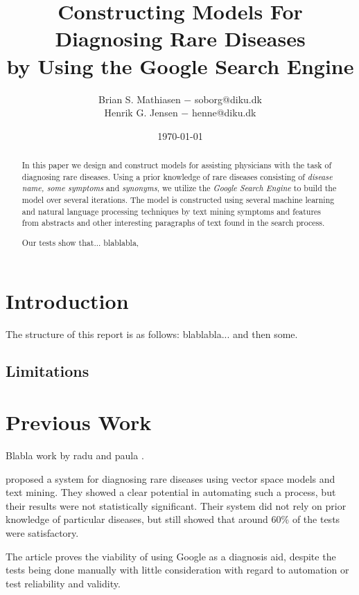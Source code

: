 \documentclass[10pt,letterpaper,final]{article}
\title{Constructing Models For Diagnosing Rare Diseases\\
        \small{by Using the Google Search Engine}}
\author{Brian S. Mathiasen $-$ soborg@diku.dk \\
        Henrik G. Jensen $-$ henne@diku.dk\\
}
\date{\today} %
\begin{document}
\maketitle
\listoffixmes


\begin{abstract}
In this paper we design and construct models for assisting physicians
with the task of diagnosing rare diseases. Using a prior knowledge of
rare diseases consisting of \textit{disease name, some symptoms} and
\textit{synonyms}, we utilize the \textit{Google Search Engine} to build
the model over several iterations. The model is constructed using
several machine learning and natural language processing techniques by
text mining symptoms and features from abstracts and other interesting
paragraphs of text found in the search process.

Our tests show that... blablabla, 
\end{abstract}
\section{Introduction}
\label{chap:introduction}


The structure of this report is as follows:
blablabla... and then some.

\subsection{Limitations}


\section{Previous Work}
Blabla work by radu and paula \cite{radupaula}.


\cite{jensenandersen} proposed a system for diagnosing rare diseases
using vector space models and text mining. They showed a clear potential
in automating such a process, but their results were not statistically
significant. Their system did not rely on prior knowledge of particular
diseases, but still showed that around 60\% of the tests were
satisfactory.


The article \cite{googlingdiagnosis} proves the viability of using
Google as a diagnosis aid, despite the tests being done manually with
little consideration with regard to automation or test reliability and
validity.

\end{document}
